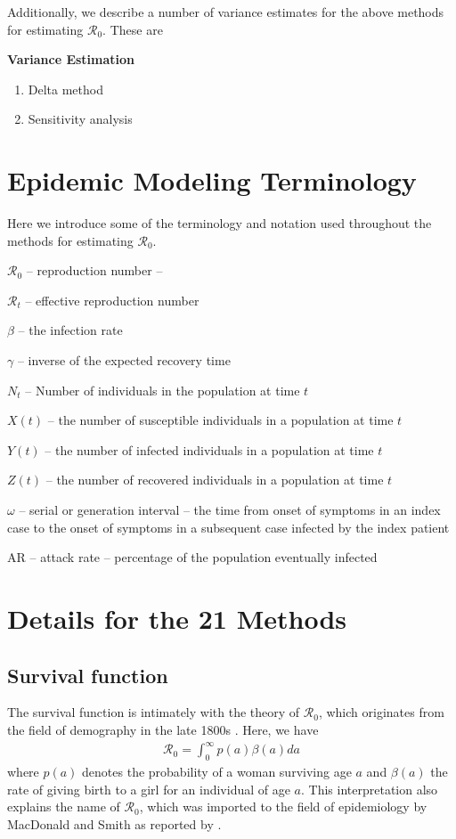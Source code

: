\documentclass[12pt]{article}
\newcommand{\XX}{21 } %
\newcommand{\rr}{\ensuremath{\mathcal{R}_0}}
\begin{document}
  Additionally, we describe a number of variance estimates for the above methods for estimating \rr.  These are
  
\textbf{Variance Estimation}
\begin{enumerate}
\item Delta method
  \item Sensitivity analysis
  \end{enumerate}



\section{Epidemic Modeling Terminology}
\label{sec:term}

Here we introduce some of the terminology and notation used throughout the methods for estimating \rr.

{$\rr$} -- reproduction number -- 

{$\mathcal{R}_t$} -- effective reproduction number

{$\beta$} -- the infection rate

{$\gamma$} -- inverse of the expected recovery time

{$N_t$} -- Number of individuals in the population at time $t$

{$X(t)$} -- the number of susceptible individuals in a population at time $t$

{$Y(t)$} -- the number of infected individuals in a population at time $t$

{$Z(t)$} -- the number of recovered individuals in a population at time $t$

{$\omega$} -- serial or generation interval -- the time from onset of symptoms in an index case to the onset of symptoms in a subsequent case infected by the index patient

AR -- attack rate -- percentage of the population eventually infected



\section{Details for the \XX Methods}
\label{sec:details}
\subsection{Survival function}
\label{sec:direct}

The survival function is intimately with the theory of \rr, which originates from the field of demography in the late 1800s \citep{dietz1993estimation}.  Here, we have
\begin{align*}
\rr = \int_0^\infty p(a) \beta(a) da
\end{align*}
where $p(a)$ denotes the probability of a woman surviving age $a$ and $\beta(a)$ the rate of giving birth to a  girl for an individual of age $a$.  This interpretation also explains the name of \rr, which was imported to the field of epidemiology by MacDonald and Smith as reported by \cite{dietz1993estimation}.
\end{document}
